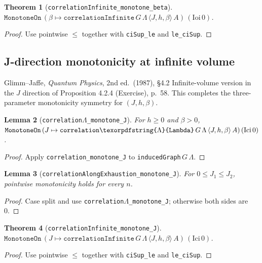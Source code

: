 \documentclass[a4paper,11pt]{article}
\newtheorem{theorem}{Theorem}
\newtheorem{lemma}[theorem]{Lemma}
\newcommand{\LeanLambda}{\texorpdfstring{\ensuremath{\Lambda}}{Lambda}}
\begin{document}
\begin{theorem}[\texttt{correlationInfinite\_monotone\_beta}]
$\texttt{MonotoneOn}\,(\beta \mapsto \texttt{correlationInfinite}\,G\,\Lambda\,\langle J,h,\beta\rangle\,A)\,(\mathrm{Ioi}\,0)$.
\end{theorem}

\begin{proof}
Use pointwise $\le$ together with \texttt{ciSup\_le} and \texttt{le\_ciSup}.
\end{proof}

\subsection{J-direction monotonicity at infinite volume}

Glimm--Jaffe, \textit{Quantum Physics}, 2nd ed.\ (1987), \S 4.2
Infinite-volume version in the $J$ direction of Proposition 4.2.4
(Exercise), p.\ 58. This completes the three-parameter monotonicity symmetry
for $(J, h, \beta)$.

\begin{lemma}[\texttt{correlation\LeanLambda\_monotone\_J}]
For $h \ge 0$ and $\beta > 0$,
$\texttt{MonotoneOn}\,(J \mapsto \texttt{correlation\LeanLambda}\,G\,\Lambda\,\langle J,h,\beta\rangle\,A)\,(\mathrm{Ici}\,0)$.
\end{lemma}

\begin{proof}
Apply \texttt{correlation\_monotone\_J} to
\texttt{inducedGraph}\,$G\,\Lambda$.
\end{proof}

\begin{lemma}[\texttt{correlationAlongExhaustion\_monotone\_J}]
For $0 \le J_1 \le J_2$, pointwise monotonicity holds for every $n$.
\end{lemma}

\begin{proof}
Case split and use \texttt{correlation\LeanLambda\_monotone\_J}; otherwise both sides
are 0.
\end{proof}

\begin{theorem}[\texttt{correlationInfinite\_monotone\_J}]
$\texttt{MonotoneOn}\,(J \mapsto \texttt{correlationInfinite}\,G\,\Lambda\,\langle J,h,\beta\rangle\,A)\,(\mathrm{Ici}\,0)$.
\end{theorem}

\begin{proof}
Use pointwise $\le$ together with \texttt{ciSup\_le} and \texttt{le\_ciSup}.
\end{proof}
\end{document}
